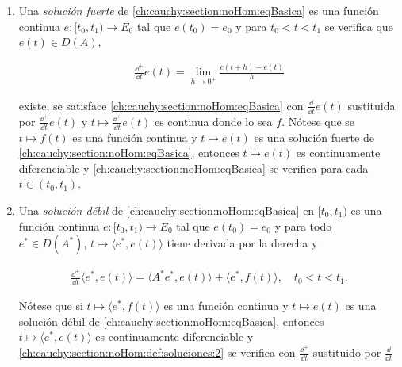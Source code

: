 \begin{Definicion}
    \label{ch:cauchy:section:noHom:def:soluciones}

    \begin{enumerate}[label=\alph*)]
        \item Una \textit{solución fuerte} de \eqref{ch:cauchy:section:noHom:eqBasica} es una función continua $e : [t_0, t_1) \rightarrow E_0$ tal que $e(t_0) = e_0$ y para $t_0 < t < t_1$ se verifica que $e(t) \in D(A)$, 

        \begin{align}
        \label{ch:cauchy:section:noHom:def:soluciones:1}
        \frac{\dd^+}{\dd t}e(t) = \lim_{h \rightarrow 0^+} \frac{e(t+h) - e(t)}{h}
        \end{align}

        existe, se satisface \eqref{ch:cauchy:section:noHom:eqBasica} con $\displaystyle\frac{\dd}{\dd t}e(t)$ sustituida por $\displaystyle\frac{\dd^+}{\dd t}e(t)$ y $t \mapsto \frac{\dd^+}{\dd t}e(t)$ es continua donde lo sea $f$. Nótese que se $t \mapsto f(t)$ es una función continua y $t \mapsto e(t)$ es una solución fuerte de \eqref{ch:cauchy:section:noHom:eqBasica}, entonces $t \mapsto e(t)$ es continuamente diferenciable y \eqref{ch:cauchy:section:noHom:eqBasica} se verifica para cada $t \in (t_0, t_1)$.

        \item Una \textit{solución débil} de \eqref{ch:cauchy:section:noHom:eqBasica} en $[t_0, t_1)$ es una función continua $e : [t_0, t_1) \rightarrow E_0$ tal que $e(t_0) = e_0$ y para todo $e^* \in D(A^*)$, $t\mapsto \langle e^*, e(t) \rangle$ tiene derivada por la derecha y

        \begin{align}
        \label{ch:cauchy:section:noHom:def:soluciones:2}
        \frac{\dd^+}{\dd t}\langle e^*, e(t)\rangle = \langle A^* e^*, e(t) \rangle + \langle e^*, f(t) \rangle, \quad t_0 < t < t_1.
        \end{align}

        Nótese que si $t \mapsto \langle e^*, f(t) \rangle$ es una función continua y $t \mapsto e(t)$ es una solución débil de \eqref{ch:cauchy:section:noHom:eqBasica}, entonces $t \mapsto \langle e^*, e(t) \rangle$ es continuamente diferenciable y \eqref{ch:cauchy:section:noHom:def:soluciones:2} se verifica con $\displaystyle\frac{\dd^+}{\dd t}$ sustituido por $\displaystyle\frac{\dd}{\dd t}$
    \end{enumerate}
\end{Definicion}

